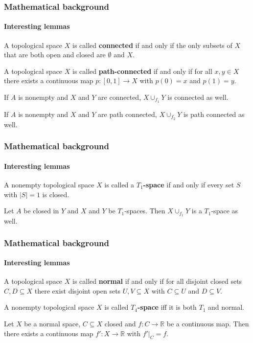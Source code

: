 \documentclass{beamer}
\begin{document}
	\begin{frame}
		\frametitle{Mathematical background}
		\framesubtitle{Interesting lemmas}
		\begin{definition}[Connectedness]
			A topological space $X$ is called \textbf{connected} if and only if the only subsets of $X$ that are both open and closed are $\emptyset$ and $X$.
		\end{definition}
		\pause[2]
		\begin{definition}
			A topological space $X$ is called \textbf{path-connected} if and only if for all $x, y \in X$ there exists a continuous map $p : [0,1] \to X$ with $p(0) = x$ and $p(1) = y$.
		\end{definition}
		\pause[3]
		\begin{lemma}
			If $A$ is nonempty and $X$ and $Y$ are connected, $X \cup_{f_1} Y$ is connected as well.
		\end{lemma}
		\pause[4]
		\begin{lemma}
			If $A$ is nonempty and $X$ and $Y$ are path connected, $X \cup_{f_2} Y$ is path connected as well.
		\end{lemma}
	\end{frame}
	\begin{frame}
		\frametitle{Mathematical background}
		\framesubtitle{Interesting lemmas}
		\begin{definition}
			A nonempty topological space $X$ is called a \textbf{$T_1$-space} if and only if every set $S$ with $\left\vert S \right\vert = 1$ is closed.
		\end{definition}
		\pause[2]
		\begin{lemma}
			Let $A$ be closed in $Y$ and $X$ and $Y$ be $T_1$-spaces. Then $X \cup_{f_1} Y$ is a $T_1$-space as well.
		\end{lemma}
	\end{frame}
	\begin{frame}
		\frametitle{Mathematical background}
		\framesubtitle{Interesting lemmas}
		\begin{definition}
			A topological space $X$ is called \textbf{normal} if and only if for all disjoint closed sets $C, D \subseteq X$ there exist disjoint open sets $U, V \subseteq X$ with $C \subseteq U$ and $D \subseteq V$.
		\end{definition}
		\pause[2]
		\begin{definition}[T4 space]
			A nonempty topological space $X$ is called \textbf{$T_4$-space} iff it is both $T_1$ and normal.
		\end{definition}
		\pause[3]
		\begin{theorem}
			Let $X$ be a normal space, $C \subseteq X$ closed and $f : C \to \mathbb{R}$ be a continuous map. Then there exists a continuous map $f' : X \to \mathbb{R}$ with $f'\vert_{C} = f$.
		\end{theorem}
	\end{frame}
\end{document}
